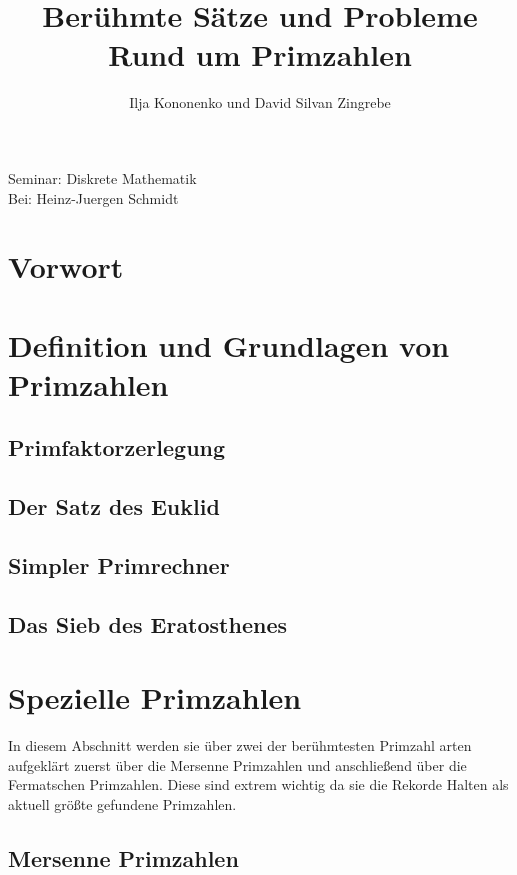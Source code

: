 \documentclass[11pt]{article}
\begin{document}
\begin{titlepage}
\title{Berühmte Sätze und Probleme Rund um Primzahlen}
\author{Ilja Kononenko und David Silvan Zingrebe}
\maketitle
Seminar: Diskrete Mathematik\\
Bei: Heinz-Juergen Schmidt\\
\end{titlepage}
\tableofcontents
\newpage
\section*{Vorwort}

\newpage
\section{Definition und Grundlagen von Primzahlen}

\subsection{Primfaktorzerlegung}

\newpage
\subsection{Der Satz des Euklid}
\newpage
\subsection{Simpler Primrechner}

\newpage
\subsection{Das Sieb des Eratosthenes}

\newpage
\section{Spezielle Primzahlen}
In diesem Abschnitt werden sie über zwei der berühmtesten Primzahl arten aufgeklärt zuerst über die Mersenne Primzahlen und anschließend über die Fermatschen Primzahlen. Diese sind extrem wichtig da sie die Rekorde Halten als aktuell größte gefundene Primzahlen.
\subsection{Mersenne Primzahlen}

\newpage
\end{document}

